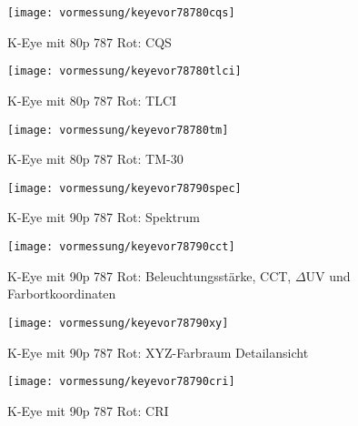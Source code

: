 \documentclass[pagesize,paper=A4,fontsize=12pt,utf8,numbers=noenddot,bibliography=totoc,listof=totoc,DIV=11,BCOR=1mm]{scrreprt}
\begin{document}
\begin{figure}[htp]     %
\centering
\texttt{[image: vormessung/keyevor78780cqs]} 
\caption {K-Eye mit 80p 787 Rot: CQS} 
\end{figure}

\begin{figure}[htp]     %
\centering
\texttt{[image: vormessung/keyevor78780tlci]} 
\caption {K-Eye mit 80p 787 Rot: TLCI} 
\end{figure}

\begin{figure}[htp]     %
\centering
\texttt{[image: vormessung/keyevor78780tm]} 
\caption {K-Eye mit 80p 787 Rot: TM-30} 
\end{figure}




\begin{figure}[htp]     %
\centering
\texttt{[image: vormessung/keyevor78790spec]} 
\caption {K-Eye mit 90p 787 Rot: Spektrum} 
\end{figure}

\begin{figure}[htp]     %
\centering
\texttt{[image: vormessung/keyevor78790cct]} 
\caption {K-Eye mit 90p 787 Rot: Beleuchtungsstärke, CCT, $\Delta$UV und Farbortkoordinaten} 
\end{figure}

\begin{figure}[htp]     %
\centering
\texttt{[image: vormessung/keyevor78790xy]} 
\caption {K-Eye mit 90p 787 Rot: XYZ-Farbraum Detailansicht} 
\end{figure}

\begin{figure}[htp]     %
\centering
\texttt{[image: vormessung/keyevor78790cri]} 
\caption {K-Eye mit 90p 787 Rot: CRI} 
\end{figure}
\end{document}
